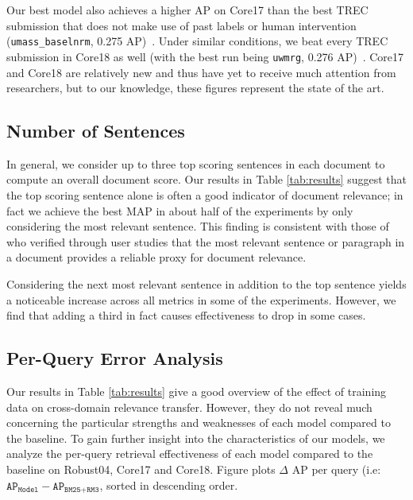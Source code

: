 Our best model also achieves a higher AP on Core17 than the best TREC submission that does not make use of past labels or human intervention (\texttt{umass\_baselnrm}, 0.275 AP)~\cite{core2017trec}.
Under similar conditions, we beat every TREC submission in Core18 as well (with the best run being \texttt{uwmrg}, 0.276 AP)~\cite{core2018trec}.
Core17 and Core18 are relatively new and thus have yet to receive much attention from researchers, but to our knowledge, these figures represent the state of the art.

\subsection{Number of Sentences}

In general, we consider up to three top scoring sentences in each document to compute an overall document score.
Our results in Table \ref{tab:results} suggest that the top scoring sentence alone is often a good indicator of document relevance; in fact we achieve the best MAP in about half of the experiments by only considering the most relevant sentence.
This finding is consistent with those of \cite{zhang2018effective} who verified through user studies that the most relevant sentence or paragraph in a document provides a reliable proxy for document relevance.

Considering the next most relevant sentence in addition to the top sentence yields a noticeable increase across all metrics in some of the experiments.
However, we find that adding a third in fact causes effectiveness to drop in some cases.

\subsection{Per-Query Error Analysis}

Our results in Table \ref{tab:results} give a good overview of the effect of training data on cross-domain relevance transfer.
However, they do not reveal much concerning the particular strengths and weaknesses of each model compared to the baseline.
To gain further insight into the characteristics of our models, we analyze the per-query retrieval effectiveness of each model compared to the baseline on Robust04, Core17 and Core18.
Figure  plots $\Delta$ AP per query (i.e: $ \texttt{AP}_{\texttt{Model}} - \texttt{AP}_{\texttt{BM25+RM3}} $, sorted in descending order.

